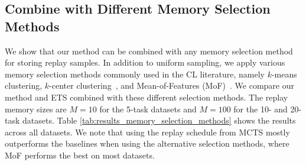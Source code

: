 %



\begin{table}[t]
	\footnotesize
	\centering
	\caption{
		Performance comparison with ACC between MCTS (Ours), Random scheduling (Random), Equal Task Schedule (ETS), and Heuristic Scheduling (Heuristic) with various memory selection methods evaluated across all datasets. We provide the metrics for training on all seen task datasets jointly (Joint) as an upper bound, as well as include the results from a breadth-first search (BFS) with Uniform memory selection for the 5-task datasets. 
		Replay memory sizes are $M=10$ and $M=100$ for the 5-task and 10/20-task datasets respectively. We report the mean and standard deviation averaged over 5 seeds. Ours performs better or on par with the baselines on most datasets and selection methods, where MoF yields the best results %
		in general.
	}
	\vspace{-3mm}
	\resizebox{0.98\textwidth}{!}{ %
			
		}
		\vspace{-3mm}
		\label{tab:results_memory_selection_methods}
	\end{table}

%
\subsection{Combine with Different Memory Selection Methods}
\label{paperC:sec:alternative_memory_selection_methods}

We show that our method can be combined with any memory selection method for storing replay samples. In addition to uniform sampling, we apply various memory selection methods commonly used in the CL literature, namely $k$-means clustering, $k$-center clustering~, and Mean-of-Features (MoF)~. We compare our method and ETS combined with these different selection methods. 
The replay memory sizes are $M=10$ for the 5-task datasets and $M=100$ for the 10- and 20-task datasets.  
Table \ref{tab:results_memory_selection_methods} shows the results across all datasets. 
We note that using the replay schedule from MCTS mostly outperforms the baselines when using the alternative selection methods, where MoF performs the best on most datasets. 


